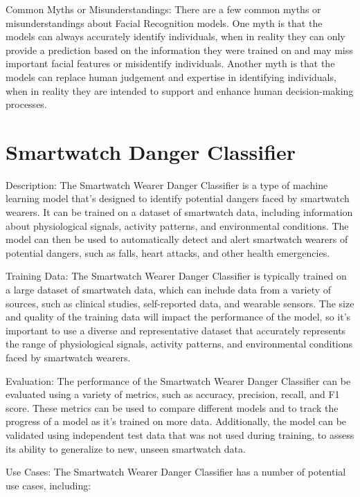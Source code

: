 Common Myths or Misunderstandings:
There are a few common myths or misunderstandings about Facial Recognition models. One myth is that the models can always accurately identify individuals, when in reality they can only provide a prediction based on the information they were trained on and may miss important facial features or misidentify individuals. Another myth is that the models can replace human judgement and expertise in identifying individuals, when in reality they are intended to support and enhance human decision-making processes.

\section{Smartwatch Danger Classifier} 

Description:
The Smartwatch Wearer Danger Classifier is a type of machine learning model that's designed to identify potential dangers faced by smartwatch wearers. It can be trained on a dataset of smartwatch data, including information about physiological signals, activity patterns, and environmental conditions. The model can then be used to automatically detect and alert smartwatch wearers of potential dangers, such as falls, heart attacks, and other health emergencies.

Training Data:
The Smartwatch Wearer Danger Classifier is typically trained on a large dataset of smartwatch data, which can include data from a variety of sources, such as clinical studies, self-reported data, and wearable sensors. The size and quality of the training data will impact the performance of the model, so it's important to use a diverse and representative dataset that accurately represents the range of physiological signals, activity patterns, and environmental conditions faced by smartwatch wearers.

Evaluation:
The performance of the Smartwatch Wearer Danger Classifier can be evaluated using a variety of metrics, such as accuracy, precision, recall, and F1 score. These metrics can be used to compare different models and to track the progress of a model as it's trained on more data. Additionally, the model can be validated using independent test data that was not used during training, to assess its ability to generalize to new, unseen smartwatch data.

Use Cases:
The Smartwatch Wearer Danger Classifier has a number of potential use cases, including:

